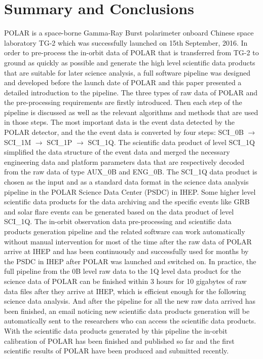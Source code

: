 \documentclass{raa}
\begin{document}
\section{Summary and Conclusions}
POLAR is a space-borne Gamma-Ray Burst polarimeter onboard Chinese space laboratory TG-2 which was successfully launched on 15th September, 2016. In order to pre-process the in-orbit data of POLAR that is transferred from TG-2 to ground as quickly as possible and generate the high level scientific data products that are suitable for later science analysis, a full software pipeline was designed and developed before the launch date of POLAR and this paper presented a detailed introduction to the pipeline. The three types of raw data of POLAR and the pre-processing requirements are firstly introduced. Then each step of the pipeline is discussed as well as the relevant algorithms and methods that are used in those steps. The most important data is the event data detected by the POLAR detector, and the the event data is converted by four steps: SCI\_0B $\rightarrow$ SCI\_1M $\rightarrow$ SCI\_1P $\rightarrow$ SCI\_1Q. The scientific data product of level SCI\_1Q simplified the data structure of the event data and merged the necessary engineering data and platform parameters data that are respectively decoded from the raw data of type AUX\_0B and ENG\_0B. The SCI\_1Q data product is chosen as the input and as a standard data format in the science data analysis pipeline in the POLAR Science Data Center (PSDC) in IHEP. Some higher level scientific data products for the data archiving and the specific events like GRB and solar flare events can be generated based on the data product of level SCI\_1Q. The in-orbit observation data pre-processing and scientific data products generation pipeline and the related software can work automatically without manual intervention for most of the time after the raw data of POLAR arrive at IHEP and has been continuously and successfully used for months by the PSDC in IHEP after POLAR was launched and switched on. In practice, the full pipeline from the 0B level raw data to the 1Q level data product for the science data of POLAR can be finished within 3 hours for 10 gigabytes of raw data files after they arrive at IHEP, which is efficient enough for the following science data analysis. And after the pipeline for all the new raw data arrived has been finished, an email noticing new scientific data products generation will be automatically sent to the researchers who can access the scientific data products. With the scientific data products generated by this pipeline the in-orbit calibration of POLAR has been finished and published so far and the first scientific results of POLAR have been produced and submitted recently.
\end{document}
